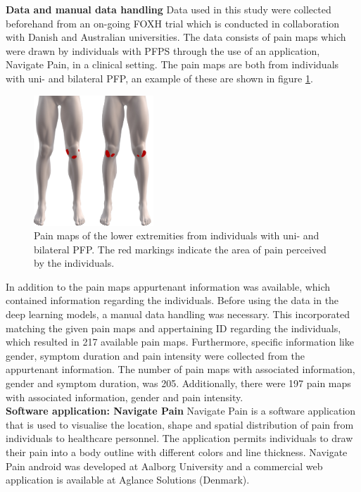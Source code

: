 \textbf{Data and manual data handling} \newline
Data used in this study were collected beforehand from an on-going FOXH trial which is conducted in collaboration with Danish and Australian universities. The data consists of pain maps which were drawn by individuals with PFPS through the use of an application, Navigate Pain, in a clinical setting. The pain maps are both from individuals with uni- and bilateral PFP, an example of these are shown in figure \ref{fig:twoPainmaps}.

\begin{figure}[h]
\centering
\includegraphics[width=0.4\textwidth]{Figures/twoPainmaps}
\caption{Pain maps of the lower extremities from individuals with uni- and bilateral PFP. The red markings indicate the area of pain perceived by the individuals.}
\label{fig:twoPainmaps}
\end{figure}

\noindent
In addition to the pain maps appurtenant information was available, which contained information regarding the individuals.
Before using the data in the deep learning models, a manual data handling was necessary. This incorporated matching the given pain maps and appertaining ID regarding the individuals, which resulted in 217 available pain maps. Furthermore, specific information like gender, symptom duration and pain intensity were collected from the appurtenant information. The number of pain maps with associated information, gender and symptom duration, was 205. Additionally, there were 197 pain maps with associated information, gender and pain intensity.\\

\noindent
\textbf{Software application: Navigate Pain} \newline
Navigate Pain is a software application that is used to visualise the location, shape and spatial distribution of pain from individuals to healthcare personnel. The application permits individuals to draw their pain into a body outline with different colors and line thickness. Navigate Pain android was developed at Aalborg University and a commercial web application is available at Aglance Solutions (Denmark).\citep{Solutions2015}\\

